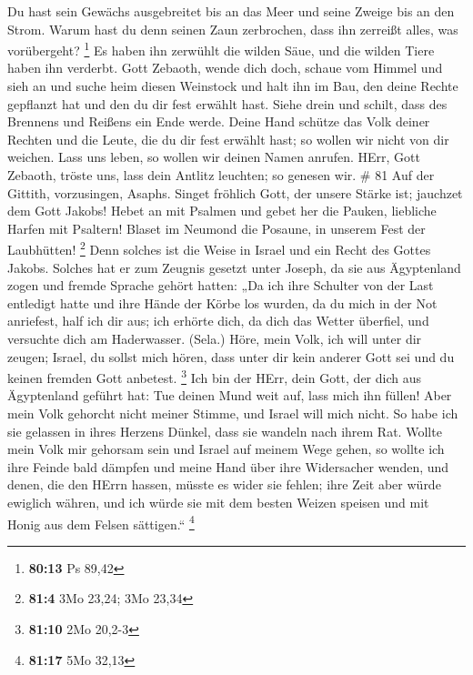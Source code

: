  Du hast sein Gewächs ausgebreitet bis an das Meer und
seine Zweige bis an den Strom.  Warum hast du denn seinen
Zaun zerbrochen, dass ihn zerreißt alles, was vorübergeht? \footnote{\textbf{80:13}
  Ps 89,42}  Es haben ihn zerwühlt die wilden Säue, und die
wilden Tiere haben ihn verderbt.  Gott Zebaoth, wende dich
doch, schaue vom Himmel und sieh an und suche heim diesen Weinstock
 und halt ihn im Bau, den deine Rechte gepflanzt hat und
den du dir fest erwählt hast.  Siehe drein und schilt, dass
des Brennens und Reißens ein Ende werde.  Deine Hand
schütze das Volk deiner Rechten und die Leute, die du dir fest erwählt
hast;  so wollen wir nicht von dir weichen. Lass uns leben,
so wollen wir deinen Namen anrufen.  HErr, Gott Zebaoth,
tröste uns, lass dein Antlitz leuchten; so genesen wir. \# 81
 Auf der Gittith, vorzusingen, Asaphs.  Singet
fröhlich Gott, der unsere Stärke ist; jauchzet dem Gott Jakobs!
 Hebet an mit Psalmen und gebet her die Pauken, liebliche
Harfen mit Psaltern!  Blaset im Neumond die Posaune, in
unserem Fest der Laubhütten! \footnote{\textbf{81:4} 3Mo 23,24; 3Mo
  23,34}  Denn solches ist die Weise in Israel und ein Recht
des Gottes Jakobs.  Solches hat er zum Zeugnis gesetzt unter
Joseph, da sie aus Ägyptenland zogen und fremde Sprache gehört hatten:
 „Da ich ihre Schulter von der Last entledigt hatte und ihre
Hände der Körbe los wurden,  da du mich in der Not
anriefest, half ich dir aus; ich erhörte dich, da dich das Wetter
überfiel, und versuchte dich am Haderwasser. (Sela.)  Höre,
mein Volk, ich will unter dir zeugen; Israel, du sollst mich hören,
 dass unter dir kein anderer Gott sei und du keinen fremden
Gott anbetest. \footnote{\textbf{81:10} 2Mo 20,2-3}  Ich
bin der HErr, dein Gott, der dich aus Ägyptenland geführt hat: Tue
deinen Mund weit auf, lass mich ihn füllen!  Aber mein Volk
gehorcht nicht meiner Stimme, und Israel will mich nicht. 
So habe ich sie gelassen in ihres Herzens Dünkel, dass sie wandeln nach
ihrem Rat.  Wollte mein Volk mir gehorsam sein und Israel
auf meinem Wege gehen,  so wollte ich ihre Feinde bald
dämpfen und meine Hand über ihre Widersacher wenden,  und
denen, die den HErrn hassen, müsste es wider sie fehlen; ihre Zeit aber
würde ewiglich währen,  und ich würde sie mit dem besten
Weizen speisen und mit Honig aus dem Felsen sättigen.`` \footnote{\textbf{81:17}
  5Mo 32,13}

